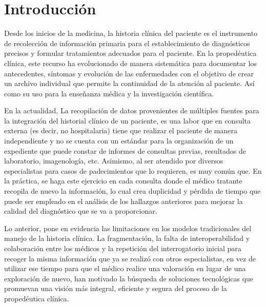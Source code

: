 \setlength{\parskip}{1em} %

\setlength{\parindent}{0pt} %


\section{Introducción}
Desde los inicios de la medicina, la historia clínica del paciente es el instrumento de recolección de información primaria para el establecimiento de diagnósticos precisos y formular tratamientos adecuados para el paciente. En la propedéutica clínica, este recurso ha evolucionado de manera sistemática para documentar los antecedentes, síntomas y evolución de las enfermedades con el objetivo de crear un archivo individual que permite la continuidad de la atención al paciente. Así como su uso para la enseñanza médica y la investigación científica. 

En la actualidad, La recopilación de datos provenientes de múltiples fuentes para la integración del historial clínico de un paciente, es una labor que en consulta externa (es decir, no hospitalaria) tiene que realizar el paciente de manera independiente y no se cuenta con un estándar para la organización de un expediente que puede constar de informes de consultas previas, resultados de laboratorio, imagenología, etc. Asimismo, al ser atendido por diversos especialistas para casos de padecimientos que lo requieren, es muy común que. En la práctica, se haga este ejercicio en cada consulta donde el médico tratante recopila de nuevo la información, lo cual crea duplicidad y pérdida de tiempo que puede ser empleado en el análisis de los hallazgos anteriores para mejorar la calidad del diagnóstico que se va a proporcionar. 

Lo anterior, pone en evidencia las limitaciones en los modelos tradicionales del manejo de la historia clínica. La fragmentación, la falta de interoperabilidad y colaboración entre los médicos y la repetición del interrogatorio inicial para recoger la misma información que ya se realizó con otros especialistas, en vez de utilizar ese tiempo para que el médico realice una valoración en lugar de una exploración de nuevo, han motivado la búsqueda de soluciones tecnológicas que promuevan una visión más integral, eficiente y segura del proceso de la propedéutica clínica.

